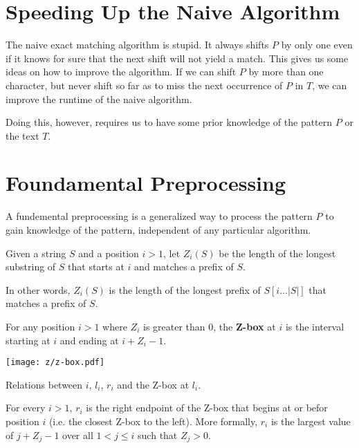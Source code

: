 \section{Speeding Up the Naive Algorithm}

The naive exact matching algorithm is stupid. It always shifts $P$ by only one even if it knows for sure that the next shift will not yield a match. This gives us some ideas on how to improve the algorithm. If we can shift $P$ by more than one character, but never shift so far as to miss the next occurrence of $P$ in $T$, we can improve the runtime of the naive algorithm.

Doing this, however, requires us to have some prior knowledge of the pattern $P$ or the text $T$.

\section{Foundamental Preprocessing}

A fundemental preprocessing is a generalized way to process the pattern $P$ to gain knowledge of the pattern, independent of any particular algorithm.

\begin{definition}
    Given a string $S$ and a position $i>1$, let $Z_i(S)$ be the length of the longest substring of $S$ that starts at $i$ and matches a prefix of $S$.

    In other words, $Z_i(S)$ is the length of the longest prefix of $S[i\ldots |S|]$ that matches a prefix of $S$.
\end{definition}

\begin{definition}[Z-box] 
    For any position $i > 1$ where $Z_i$ is greater than 0, the \textbf{Z-box} at $i$ is the interval starting at $i$ and ending at $i+Z_i-1$.
\end{definition}

\begin{marginfigure}
    \texttt{[image: z/z-box.pdf]}
    \caption{Relations between $i$, $l_i$, $r_i$ and the Z-box at $l_i$.}
    \label{fig:z-box}
\end{marginfigure}

\begin{definition}
    For every $i > 1$, $r_i$ is the right endpoint of the Z-box that begins at or befor position $i$ (i.e. the closest Z-box to the left). More formally, $r_i$ is the largest value of $j + Z_j - 1$ over all $1 < j \leq i$ such that $Z_j > 0$.
\end{definition}